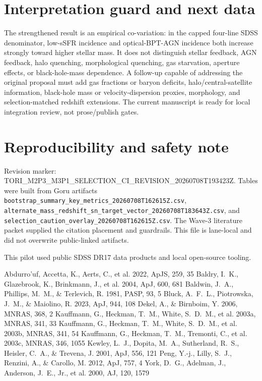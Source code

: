\documentclass[twocolumn]{aastex631}
\begin{document}
\section{Interpretation guard and next data}
The strengthened result is an empirical co-variation: in the capped four-line SDSS denominator, low-sSFR incidence and optical-BPT-AGN incidence both increase strongly toward higher stellar mass.  It does not distinguish stellar feedback, AGN feedback, halo quenching, morphological quenching, gas starvation, aperture effects, or black-hole-mass dependence.  A follow-up capable of addressing the original proposal must add gas fractions or baryon deficits, halo/central-satellite information, black-hole mass or velocity-dispersion proxies, morphology, and selection-matched redshift extensions.  The current manuscript is ready for local integration review, not prose/publish gates.

\section*{Reproducibility and safety note}
Revision marker: TORI\_M2P3\_M3P1\_SELECTION\_CI\_REVISION\_20260708T193423Z.  Tables were built from Goru artifacts \texttt{bootstrap\_summary\_key\_metrics\_20260708T162615Z.csv}, \texttt{alternate\_mass\_redshift\_sn\_target\_vector\_20260708T183643Z.csv}, and \texttt{selection\_caution\_overlay\_20260708T162615Z.csv}.  The Wave-3 literature packet supplied the citation placement and guardrails.  This file is lane-local and did not overwrite public-linked artifacts.

\acknowledgments
This pilot used public SDSS DR17 data products and local open-source tooling.

\begin{thebibliography}{}
 Abdurro'uf, Accetta, K., Aerts, C., et al. 2022, ApJS, 259, 35
 Baldry, I.~K., Glazebrook, K., Brinkmann, J., et al. 2004, ApJ, 600, 681
 Baldwin, J.~A., Phillips, M.~M., \& Terlevich, R. 1981, PASP, 93, 5
 Bluck, A.~F.~L., Piotrowska, J.~M., \& Maiolino, R. 2023, ApJ, 944, 108
 Dekel, A., \& Birnboim, Y. 2006, MNRAS, 368, 2
 Kauffmann, G., Heckman, T.~M., White, S.~D.~M., et al. 2003a, MNRAS, 341, 33
 Kauffmann, G., Heckman, T.~M., White, S.~D.~M., et al. 2003b, MNRAS, 341, 54
 Kauffmann, G., Heckman, T.~M., Tremonti, C., et al. 2003c, MNRAS, 346, 1055
 Kewley, L.~J., Dopita, M.~A., Sutherland, R.~S., Heisler, C.~A., \& Trevena, J. 2001, ApJ, 556, 121
 Peng, Y.-j., Lilly, S.~J., Renzini, A., \& Carollo, M. 2012, ApJ, 757, 4
 York, D.~G., Adelman, J., Anderson, J.~E., Jr., et al. 2000, AJ, 120, 1579
\end{thebibliography}
\end{document}
